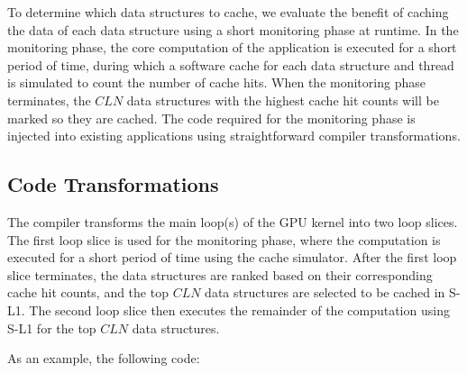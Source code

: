To determine which data structures to cache, we evaluate the benefit of caching the data of each
data structure using a short monitoring phase at runtime.
In the monitoring phase, the core computation of the application is executed for a short period of
time, during which a software cache for each data structure and thread is simulated to count the number of cache hits.
When the monitoring phase terminates, the $CLN$ data structures with the highest cache hit counts
will be marked so they are cached. 
The code required for the monitoring phase is injected into existing applications using straightforward
compiler transformations. 




\subsection{Code Transformations}
The compiler transforms the main loop(s) of the GPU kernel into two loop slices. 
The first loop slice is used for the monitoring phase, where the computation is executed for a short
period of time using the cache simulator.
After the first loop slice terminates, the data structures are ranked based on their corresponding
cache hit counts, and the top $CLN$ data structures are selected to be cached in S-L1. 
The second loop slice then executes the remainder of the computation using S-L1 for the top $CLN$
data structures.

As an example, the following code:

{\scriptsize
\begin{flushleft}
\verb%  //Some initialization%
\\ \verb%  for(int i = start; i < end; i ++) {%
\\ \verb%       char a = charInput[i];%
\\ \verb%       int b = intInput[i];%
\\ \verb%   %
\\ \verb%       int e = doComputation(a, b);%
\\ \verb%       intOutput[i] = e;%
\\ \verb%  }%
\\ \verb%  //Some final computation%
\end{flushleft}
}

